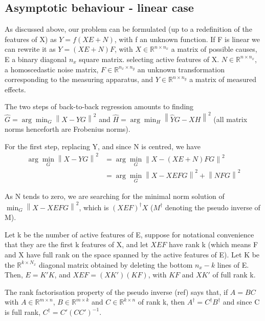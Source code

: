 \documentclass{article}
\begin{document}
\subsection{Asymptotic behaviour - linear case}
As discussed above, our problem can be formulated (up to a redefinition of the features of X) as $Y=f(XE+N)$, with f an unknown function.
%
If F is linear we can rewrite it as $Y = (XE + N)F$, with $X\in\mathbb{R}^{n\times n_{x}}$ a matrix of possible causes, E a  binary diagonal $n_{x}$ square matrix. selecting active features of X.
%
$N\in\mathbb{R}^{n\times n_{x}}$, a homoscedastic noise matrix, $F\in\mathbb{R}^{n_{x}\times n_{y}}$ an unknown transformation corresponding to the measuring apparatus, and $Y\in\mathbb{R}^{n\times n_{y}}$ a matrix of measured effects.

The two steps of back-to-back regression amounts to finding $\hat G=\arg \min_G \left \| X-YG \right \|^2$ and $\hat H =\arg \min_H \left \| \hat YG - XH \right \|^2$ (all matrix norms henceforth are Frobenius norms).

For the first step, replacing Y, and since N is centred, we have
\begin{equation}
\begin{aligned}
\arg \min_G \left \| X-YG \right \|^2 &= \arg \min_G \left \| X - (XE+N)FG\right\|^2 \\
&{}= \arg \min_G \left \| X-XEFG\right\| ^2  + \left \| NFG\right \| ^2
\end{aligned}
\end{equation}

As N tends to zero, we are searching for the minimal norm solution of $\min_G \left \| X-XEFG\right\| ^2$, which is $(XEF)^\dagger X$ ($M^\dagger$ denoting the pseudo inverse of M).

Let k be the number of active features of E, suppose for notational convenience that they are the first k features of X, and let $XEF$ have rank k (which means F and X have full rank on the space spanned by the active features of E). Let K be the $\mathbb{R}^{k\times N_{x}}$ diagonal matrix obtained by deleting the bottom $n_{x}-k$ lines of E. Then, $E=K'K$, and $XEF=(XK')(KF)$, with $KF$  and $XK'$ of full rank k.

The rank factorisation property of the pseudo inverse (ref) says that, if $A=BC$ with $A\in\mathbb{R}^{m\times n}$, $B\in\mathbb{R}^{m\times k}$ and $C\in\mathbb{R}^{k\times n}$ of rank k, then $A^\dagger=C^\dagger B^\dagger$ and since C is full rank, $C^\dagger=C' (CC')^{-1}$.
\end{document}
